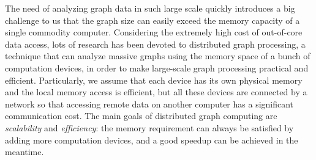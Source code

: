 \documentclass{sokendai_thesis} %
\begin{document}
The need of analyzing graph data in such large scale quickly introduces a big challenge to us that the graph size can easily exceed the memory capacity of a single commodity computer.
Considering the extremely high cost of out-of-core data access, lots of research has been devoted to distributed graph processing, a technique that can analyze massive graphs using the memory space of a bunch of computation devices, in order to make large-scale graph processing practical and efficient.
Particularly, we assume that each device has its own physical memory and the local memory access is efficient, but all these devices are connected by a network so that accessing remote data on another computer has a significant communication cost.
The main goals of distributed graph computing are \emph{scalability} and \emph{efficiency}: the memory requirement can always be satisfied by adding more computation devices, and a good speedup can be achieved in the meantime.
\end{document}
